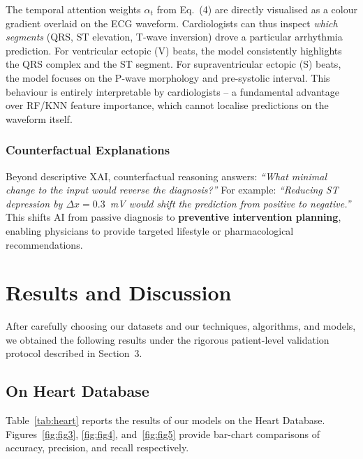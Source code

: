 \documentclass[10pt, twocolumn]{article}
\begin{document}
The temporal attention weights $\alpha_t$ from Eq.~(4) are directly visualised as a colour
gradient overlaid on the ECG waveform.
Cardiologists can thus inspect \textit{which segments} (QRS, ST elevation, T-wave inversion)
drove a particular arrhythmia prediction.
For ventricular ectopic (V) beats, the model consistently highlights the QRS complex and
the ST segment.
For supraventricular ectopic (S) beats, the model focuses on the P-wave morphology and
pre-systolic interval.
This behaviour is entirely interpretable by cardiologists -- a fundamental advantage over
RF/KNN feature importance, which cannot localise predictions on the waveform itself.

\subsubsection{Counterfactual Explanations}

Beyond descriptive XAI, counterfactual reasoning answers:
\textit{``What minimal change to the input would reverse the diagnosis?''}
For example: \textit{``Reducing ST depression by $\Delta x = 0.3$~mV would shift the
prediction from positive to negative.''~}
This shifts AI from passive diagnosis to \textbf{preventive intervention planning},
enabling physicians to provide targeted lifestyle or pharmacological recommendations.

\section{Results and Discussion}

After carefully choosing our datasets and our techniques, algorithms, and models,
we obtained the following results under the rigorous patient-level validation protocol
described in Section~3.

\subsection{On Heart Database}

Table~\ref{tab:heart} reports the results of our models on the Heart Database.
Figures~\ref{fig:fig3}, \ref{fig:fig4}, and~\ref{fig:fig5} provide bar-chart comparisons
of accuracy, precision, and recall respectively.
\end{document}
